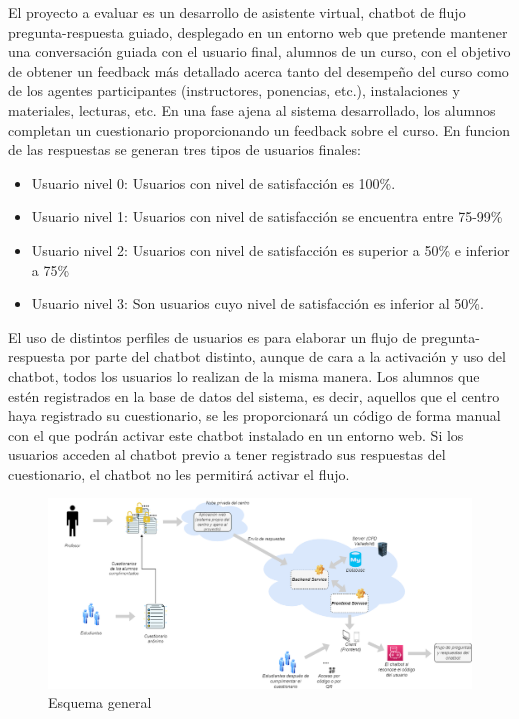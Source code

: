 El proyecto a evaluar es un desarrollo de asistente virtual, chatbot de flujo pregunta-respuesta guiado, desplegado en un entorno web que pretende mantener una conversación guiada con el usuario final, alumnos de un curso, con el objetivo de obtener un feedback más detallado acerca tanto del desempeño del curso como de los agentes participantes (instructores, ponencias, etc.), instalaciones y materiales, lecturas, etc. En una fase ajena al sistema desarrollado, los alumnos completan un cuestionario proporcionando un feedback sobre el curso. En funcion de las respuestas se generan tres tipos de usuarios finales:



\begin{itemize}
    \item Usuario nivel 0: Usuarios con nivel de satisfacción es 100\%.
    \item Usuario nivel 1: Usuarios con nivel de satisfacción se encuentra entre 75-99\%
    \item Usuario nivel 2: Usuarios con nivel de satisfacción es superior a 50\% e inferior a 75\%
    \item Usuario nivel 3: Son usuarios cuyo nivel de satisfacción es inferior al 50\%.
\end{itemize}

El uso de distintos perfiles de usuarios es para elaborar un flujo de pregunta-respuesta por parte del chatbot distinto, aunque de cara a la activación y uso del chatbot, todos los usuarios lo realizan de la misma manera. Los alumnos que estén registrados en la base de datos del sistema, es decir, aquellos que el centro haya registrado su cuestionario, se les proporcionará un código de forma manual con el que podrán activar este chatbot instalado en un entorno web. Si los usuarios acceden al chatbot previo a tener registrado sus respuestas del cuestionario, el chatbot no les permitirá activar el flujo.


\begin{figure}[h]
\includegraphics[width=\textwidth]{figures/EsquemaGeneral.png}
\caption{Esquema general}
\label{fig:esquema}
\end{figure}

